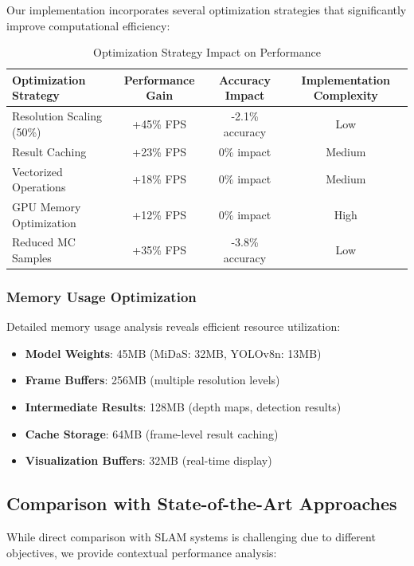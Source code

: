 \documentclass[12pt,oneside]{book}
\begin{document}
Our implementation incorporates several optimization strategies that significantly improve computational efficiency:

\begin{table}[ht]
\centering
\caption{Optimization Strategy Impact on Performance}
\label{tab:optimization_impact}
\begin{tabular}{@{}lccc@{}}
\toprule
\textbf{Optimization Strategy} & \textbf{Performance Gain} & \textbf{Accuracy Impact} & \textbf{Implementation Complexity} \\
\midrule
Resolution Scaling (50\%) & +45\% FPS & -2.1\% accuracy & Low \\
Result Caching & +23\% FPS & 0\% impact & Medium \\
Vectorized Operations & +18\% FPS & 0\% impact & Medium \\
GPU Memory Optimization & +12\% FPS & 0\% impact & High \\
Reduced MC Samples & +35\% FPS & -3.8\% accuracy & Low \\
\bottomrule
\end{tabular}
\end{table}

\subsubsection{Memory Usage Optimization}

Detailed memory usage analysis reveals efficient resource utilization:

\begin{itemize}
\item \textbf{Model Weights}: 45MB (MiDaS: 32MB, YOLOv8n: 13MB)
\item \textbf{Frame Buffers}: 256MB (multiple resolution levels)
\item \textbf{Intermediate Results}: 128MB (depth maps, detection results)
\item \textbf{Cache Storage}: 64MB (frame-level result caching)
\item \textbf{Visualization Buffers}: 32MB (real-time display)
\end{itemize}

\subsection{Comparison with State-of-the-Art Approaches}

While direct comparison with SLAM systems is challenging due to different objectives, we provide contextual performance analysis:
\end{document}
